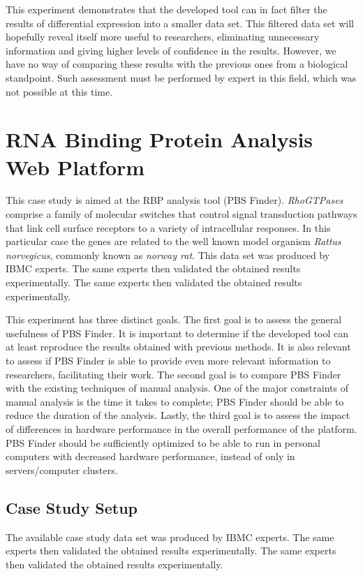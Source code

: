 This experiment demonstrates that the developed tool can in fact filter the
results of differential expression into a smaller data set. This filtered data
set will hopefully reveal itself more useful to researchers, eliminating
unnecessary information and giving higher levels of confidence in the results.
However, we have no way of comparing these results with the previous ones from a
biological standpoint. Such assessment must be performed by expert in this
field, which was not possible at this time.

\section{RNA Binding Protein Analysis Web Platform}

This case study is aimed at the RBP analysis tool (PBS Finder).
\emph{RhoGTPases} comprise a family of molecular switches that control signal
transduction pathways that link cell surface receptors to a variety of
intracellular responses. In this particular case the genes are related to the
well known model organism \emph{Rattus norvegicus}, commonly known as
\emph{norway rat}. This data set was produced by IBMC experts. The same experts
then validated the obtained results experimentally. The same experts then
validated the obtained results experimentally.

This experiment has three distinct goals. The first goal is to assess the
general usefulness of PBS Finder. It is important to determine if the developed
tool can at least reproduce the results obtained with previous methods. It is
also relevant to assess if PBS Finder is able to provide even more relevant
information to researchers, facilitating their work. The second goal is to
compare PBS Finder with the existing techniques of manual analysis. One of the
major constraints of manual analysis is the time it takes to complete; PBS
Finder should be able to reduce the duration of the analysis. Lastly, the third
goal is to assess the impact of differences in hardware performance in the
overall performance of the platform. PBS Finder should be sufficiently optimized
to be able to run in personal computers with decreased hardware performance,
instead of only in servers/computer clusters.

\subsection{Case Study Setup}

The available case study data set was produced by IBMC experts. The same experts
then validated the obtained results experimentally. The same experts then
validated the obtained results experimentally.

